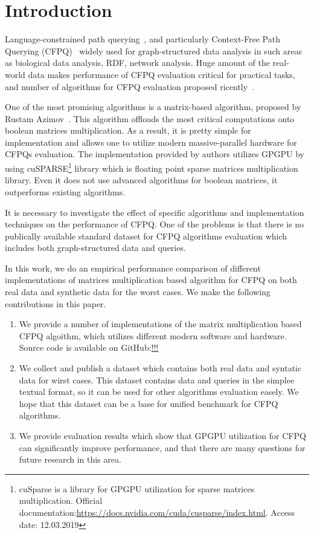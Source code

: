 \section{Introduction}

Language-constrained path querying~\cite{FLCpathProblem}, and particularly Context-Free Path Querying (CFPQ)~\cite{Yannakakis} widely used for graph-structured data analysis in such areas as biological data analysis, RDF, network analysis.
Huge amount of the real-world data makes performance of CFPQ evaluation critical for practical tasks, and number of algorithms for CFPQ evaluation proposed ricently~\cite{hellingsPathQuerying,Grigorev:2017:CPQ:3166094.3166104,Verbitskaia:2018:PCC:3241653.3241655,RDF,10.1007/978-3-319-91662-0_17,Medeiros:2018:EEC:3167132.3167265}.

One of the most promising algorithms is a matrix-based algorithm, proposed by Rustam Azimov~\cite{Azimov:2018:CPQ:3210259.3210264}.
This algorithm offloads the most critical computations onto boolean matrices multiplication.
As a result, it is pretty simple for implementation and allows one to utilize modern massive-parallel hardware for CFPQs evaluation.
The implementation provided by authors utilizes GPGPU by using cuSPARSE\footnote{cuSparse is a library for GPGPU utilization for sparse matrices multiplication. Official documentation:\url{https://docs.nvidia.com/cuda/cusparse/index.html}. Access date: 12.03.2019} library which is floating point sparse matrices multiplication library.
Even it does not use advanced algorithms for boolean matrices, it outperforms existing algorithms.

It is necessary to investigate the effect of specific algorithms and implementation techniques on the performance of CFPQ.
One of the problems is that there is no publically available standard dataset for CFPQ algorithms evaluation which includes both graph-structured data and queries.

In this work, we do an empirical performance comparison of different implementations of matrices multiplication based algorithm for CFPQ on both real data and synthetic data for the worst cases.
We make the following contributions in this paper.

\begin{enumerate}
\item We provide a number of implementations of the matrix multiplication based CFPQ algoithm, which utilizes different modern software and hardware.
Source code is available on GitHub:\url{!!!}
\item We collect and publish a dataset which contains both real data and syntatic data for wirst cases.
This dataset contains data and queries in the simplee textual format, so it can be used for other algorithms evaluation easely.
We hope that this dataset can be a base for unified benchmark for CFPQ algorithms.
\item We provide evaluation results which show that GPGPU utilization for CFPQ can significantly improve performance, and that there are many questions for future research in this area.
\end{enumerate}
